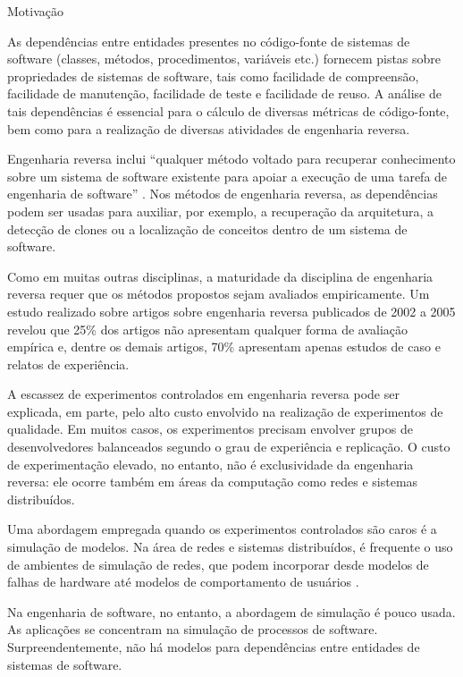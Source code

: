 \begin{section}{Motivação}


	As dependências entre entidades presentes no código-fonte de sistemas de software (classes, métodos, procedimentos, variáveis etc.) fornecem pistas sobre propriedades de sistemas de software, tais como facilidade de compreensão, facilidade de manutenção, facilidade de teste e facilidade de reuso. 
	A análise de tais dependências é essencial para o cálculo de diversas métricas de código-fonte, bem como para a realização de diversas atividades de engenharia reversa.

	Engenharia reversa inclui ``qualquer método voltado para recuperar conhecimento sobre um sistema de software existente para apoiar a execução de uma tarefa de engenharia de software'' \cite{Tonella2007}. Nos métodos de engenharia reversa, as dependências podem ser usadas para auxiliar, por exemplo, a recuperação da arquitetura, a detecção de clones ou a localização de conceitos dentro de um sistema de software. 

	Como em muitas outras disciplinas, a maturidade da disciplina de engenharia reversa requer que os métodos propostos sejam avaliados empiricamente. Um estudo realizado sobre artigos sobre engenharia reversa publicados de 2002 a 2005 revelou que 25\% dos artigos não apresentam qualquer forma de avaliação empírica e, dentre os demais artigos, 70\% apresentam apenas estudos de caso e relatos de experiência.

	A escassez de experimentos controlados em engenharia reversa pode ser explicada, em parte, pelo alto custo envolvido na realização de experimentos de qualidade. Em muitos casos, os experimentos precisam envolver grupos de desenvolvedores balanceados segundo o grau de experiência e replicação. O custo de experimentação elevado, no entanto, não é exclusividade da engenharia reversa: ele ocorre também em áreas da computação como redes e sistemas distribuídos.

	Uma abordagem empregada quando os experimentos controlados são caros é a simulação de modelos. Na área de redes e sistemas distribuídos, é frequente o uso de ambientes de simulação de redes, que podem incorporar desde modelos de falhas de hardware até modelos de comportamento de usuários \cite{White2002}.

	Na engenharia de software, no entanto, a abordagem de simulação é pouco usada. As aplicações se concentram na simulação de processos de software. Surpreendentemente, não há modelos para dependências entre entidades de sistemas de software.	
\end{section}

